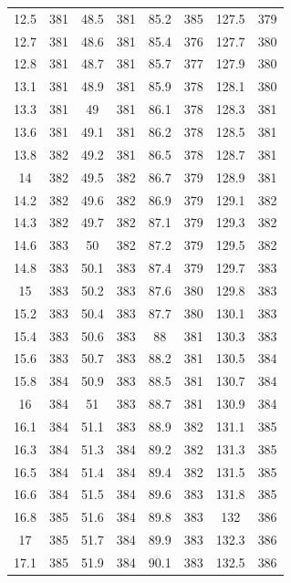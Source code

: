 \documentclass[12pt]{ctexart}
\numberwithin{equation}{section}
\begin{document}
\begin{longtable}{cc|cc|cc|cc}
12.5  &  381  &  48.5  &  381  &  85.2  &  385  &  127.5  &  379  \\
12.7  &  381  &  48.6  &  381  &  85.4  &  376  &  127.7  &  380  \\
12.8  &  381  &  48.7  &  381  &  85.7  &  377  &  127.9  &  380  \\
13.1  &  381  &  48.9  &  381  &  85.9  &  378  &  128.1  &  380  \\
13.3  &  381  &  49  &  381  &  86.1  &  378  &  128.3  &  381  \\
13.6  &  381  &  49.1  &  381  &  86.2  &  378  &  128.5  &  381  \\
13.8  &  382  &  49.2  &  381  &  86.5  &  378  &  128.7  &  381  \\
14  &  382  &  49.5  &  382  &  86.7  &  379  &  128.9  &  381  \\
14.2  &  382  &  49.6  &  382  &  86.9  &  379  &  129.1  &  382  \\
14.3  &  382  &  49.7  &  382  &  87.1  &  379  &  129.3  &  382  \\
14.6  &  383  &  50  &  382  &  87.2  &  379  &  129.5  &  382  \\
14.8  &  383  &  50.1  &  383  &  87.4  &  379  &  129.7  &  383  \\
15  &  383  &  50.2  &  383  &  87.6  &  380  &  129.8  &  383  \\
15.2  &  383  &  50.4  &  383  &  87.7  &  380  &  130.1  &  383  \\
15.4  &  383  &  50.6  &  383  &  88  &  381  &  130.3  &  383  \\
15.6  &  383  &  50.7  &  383  &  88.2  &  381  &  130.5  &  384  \\
15.8  &  384  &  50.9  &  383  &  88.5  &  381  &  130.7  &  384  \\
16  &  384  &  51  &  383  &  88.7  &  381  &  130.9  &  384  \\
16.1  &  384  &  51.1  &  383  &  88.9  &  382  &  131.1  &  385  \\
16.3  &  384  &  51.3  &  384  &  89.2  &  382  &  131.3  &  385  \\
16.5  &  384  &  51.4  &  384  &  89.4  &  382  &  131.5  &  385  \\
16.6  &  384  &  51.5  &  384  &  89.6  &  383  &  131.8  &  385  \\
16.8  &  385  &  51.6  &  384  &  89.8  &  383  &  132  &  386  \\
17  &  385  &  51.7  &  384  &  89.9  &  383  &  132.3  &  386  \\
17.1  &  385  &  51.9  &  384  &  90.1  &  383  &  132.5  &  386  \\

\end{longtable}
\end{document}

